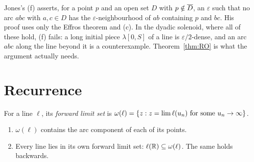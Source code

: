 
\begin{remark}
Jones's (f) asserts, for a point $p$ and an open set $D$ with $p\notin\overline{D}$, an $\varepsilon$ such that no arc $abc$ with $a,c\in D$ has
the $\varepsilon$-neighbourhood of $ab$ containing $p$ and $bc$. His proof uses only the Effros theorem and (c). In the dyadic
solenoid, where all of these hold, (f) fails: a long initial piece $\lambda[0,S]$ of a line is $\varepsilon/2$-dense, and an arc $abc$
along the line beyond it is a counterexample. Theorem~\ref{thm:RO} is what the argument actually needs.
\end{remark}

\section{Recurrence}\label{sec:recurrence}

For a line $\ell$, its \emph{forward limit set} is $\omega(\ell)=\left\{ z: z=\lim\ell(u_n)\text{ for some }u_n\to\infty \right\}$.


\begin{theorem}\label{thm:recurrent}
\leavevmode
\begin{enumerate}[label=(\alph*)]
\item $\omega(\ell)$ contains the arc component of each of its points.
\item Every line lies in its own forward limit set: $\ell(\mathbb{R})\subseteq\omega(\ell)$. The same holds backwards.
\end{enumerate}
\end{theorem}

